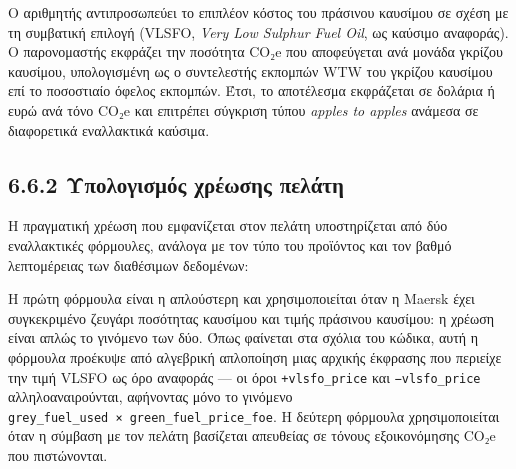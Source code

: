 Ο αριθμητής αντιπροσωπεύει το επιπλέον κόστος του πράσινου καυσίμου σε
σχέση με τη συμβατική επιλογή (VLSFO, \emph{Very Low Sulphur Fuel Oil},
ως καύσιμο αναφοράς). Ο παρονομαστής εκφράζει την ποσότητα CO₂e που
αποφεύγεται ανά μονάδα γκρίζου καυσίμου, υπολογισμένη ως ο συντελεστής
εκπομπών WTW του γκρίζου καυσίμου επί το ποσοστιαίο όφελος εκπομπών.
Έτσι, το αποτέλεσμα εκφράζεται σε δολάρια ή ευρώ ανά τόνο CO₂e και
επιτρέπει σύγκριση τύπου \emph{apples to apples} ανάμεσα σε διαφορετικά
εναλλακτικά καύσιμα.

\subsection{6.6.2 Υπολογισμός χρέωσης
πελάτη}\label{ux3c5ux3c0ux3bfux3bbux3bfux3b3ux3b9ux3c3ux3bcux3ccux3c2-ux3c7ux3c1ux3adux3c9ux3c3ux3b7ux3c2-ux3c0ux3b5ux3bbux3acux3c4ux3b7}

Η πραγματική χρέωση που εμφανίζεται στον πελάτη υποστηρίζεται από δύο
εναλλακτικές φόρμουλες, ανάλογα με τον τύπο του προϊόντος και τον βαθμό
λεπτομέρειας των διαθέσιμων δεδομένων:

\begin{Shaded}
\begin{Highlighting}[]
\FunctionTok{(}\NormalTok{\%}\FunctionTok{\{}
    \FunctionTok{\})} 
  \FunctionTok{(}\FunctionTok{)}

\FunctionTok{(}\NormalTok{\%}\FunctionTok{\{}
    \FunctionTok{\})} 
  \FunctionTok{(}\FunctionTok{)}
\end{Highlighting}
\end{Shaded}

Η πρώτη φόρμουλα είναι η απλούστερη και χρησιμοποιείται όταν η Maersk
έχει συγκεκριμένο ζευγάρι ποσότητας καυσίμου και τιμής πράσινου
καυσίμου: η χρέωση είναι απλώς το γινόμενο των δύο. Όπως φαίνεται στα
σχόλια του κώδικα, αυτή η φόρμουλα προέκυψε από αλγεβρική απλοποίηση
μιας αρχικής έκφρασης που περιείχε την τιμή VLSFO ως όρο αναφοράς --- οι
όροι \texttt{+vlsfo\_price} και \texttt{−vlsfo\_price}
αλληλοαναιρούνται, αφήνοντας μόνο το γινόμενο
\texttt{grey\_fuel\_used\ ×\ green\_fuel\_price\_foe}. Η δεύτερη
φόρμουλα χρησιμοποιείται όταν η σύμβαση με τον πελάτη βασίζεται
απευθείας σε τόνους εξοικονόμησης CO₂e που πιστώνονται.

